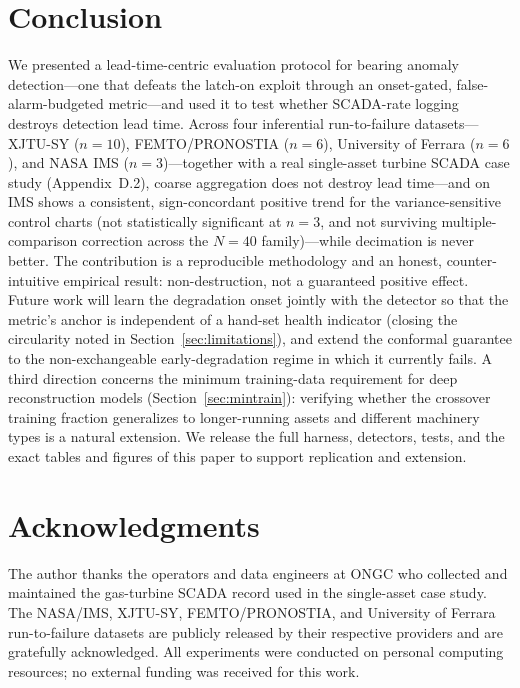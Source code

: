 \documentclass[IJPHM, 2026, 0]{PHMSociety}
\begin{document}
\section{Conclusion}
We presented a lead-time-centric evaluation protocol for bearing anomaly detection---one that defeats the latch-on exploit through an onset-gated, false-alarm-budgeted metric---and used it to test whether SCADA-rate logging destroys detection lead time. Across four inferential run-to-failure datasets---XJTU-SY ($n=10$), FEMTO/PRONOSTIA ($n=6$), University of Ferrara ($n=6$), and NASA IMS ($n=3$)---together with a real single-asset turbine SCADA case study (Appendix~D.2), coarse aggregation does not destroy lead time---and on IMS shows a consistent, sign-concordant positive trend for the variance-sensitive control charts (not statistically significant at $n=3$, and not surviving multiple-comparison correction across the $N=40$ family)---while decimation is never better. The contribution is a reproducible methodology and an honest, counter-intuitive empirical result: non-destruction, not a guaranteed positive effect. Future work will learn the degradation onset jointly with the detector so that the metric's anchor is independent of a hand-set health indicator (closing the circularity noted in Section~\ref{sec:limitations}), and extend the conformal guarantee to the non-exchangeable early-degradation regime in which it currently fails. A third direction concerns the minimum training-data requirement for deep reconstruction models (Section~\ref{sec:mintrain}): verifying whether the crossover training fraction generalizes to longer-running assets and different machinery types is a natural extension. We release the full harness, detectors, tests, and the exact tables and figures of this paper to support replication and extension.


\FloatBarrier
\section*{Acknowledgments}
The author thanks the operators and data engineers at ONGC who collected and maintained the gas-turbine SCADA record used in the single-asset case study. The NASA/IMS, XJTU-SY, FEMTO/PRONOSTIA, and University of Ferrara run-to-failure datasets are publicly released by their respective providers and are gratefully acknowledged. All experiments were conducted on personal computing resources; no external funding was received for this work.
\end{document}
